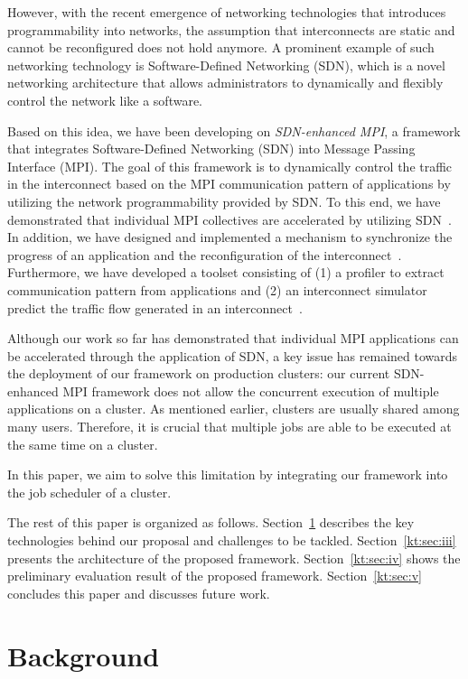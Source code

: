 \documentclass[graybox]{svmult}
\begin{document}
However, with the recent emergence of networking technologies that introduces
programmability into networks, the assumption that interconnects are static
and cannot be reconfigured does not hold anymore. A prominent example of such
networking technology is Software-Defined Networking (SDN), which is a novel
networking architecture that allows administrators to dynamically and flexibly
control the network like a software.

Based on this idea, we have been developing on \textit{SDN-enhanced MPI}, a
framework that integrates Software-Defined Networking (SDN) into Message
Passing Interface (MPI). The goal of this framework is to dynamically control
the traffic in the interconnect based on the MPI communication pattern of
applications by utilizing the network programmability provided by SDN\@. To
this end, we have demonstrated that individual MPI collectives are accelerated
by utilizing SDN~\cite{Dashdavaa2014,Takahashi2014}. In addition, we have
designed and implemented a mechanism to synchronize the progress of an
application and the reconfiguration of the
interconnect~\cite{Takahashi2015,Takahashi2018}. Furthermore, we have
developed a toolset consisting of (1) a profiler to extract communication
pattern from applications and (2) an interconnect simulator predict the
traffic flow generated in an interconnect~\cite{Takahashi2017}.

Although our work so far has demonstrated that individual MPI applications can
be accelerated through the application of SDN, a key issue has remained
towards the deployment of our framework on production clusters: our current
SDN-enhanced MPI framework does not allow the concurrent execution of multiple
applications on a cluster. As mentioned earlier, clusters are usually shared
among many users. Therefore, it is crucial that multiple jobs are able to be
executed at the same time on a cluster.

In this paper, we aim to solve this limitation by integrating our framework
into the job scheduler of a cluster.

The rest of this paper is organized as follows. Section~\ref{kt:sec:ii}
describes the key technologies behind our proposal and challenges to be
tackled. Section~\ref{kt:sec:iii} presents the architecture of the proposed
framework. Section~\ref{kt:sec:iv} shows the preliminary evaluation result of
the proposed framework. Section~\ref{kt:sec:v} concludes this paper and
discusses future work.

\section{Background}\label{kt:sec:ii}
\end{document}
